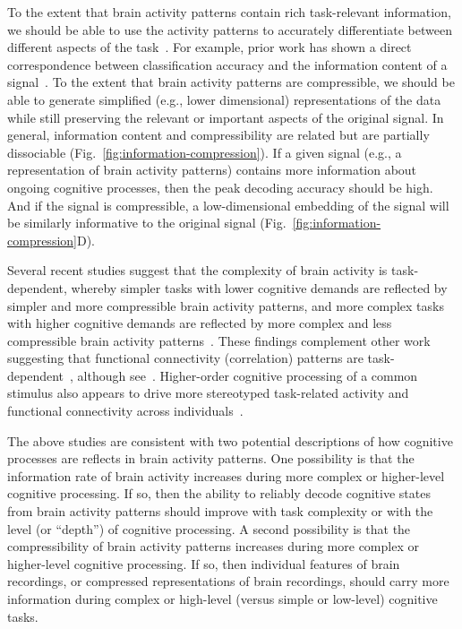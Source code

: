 \documentclass[english, 11pt]{article}
\begin{document}
To the extent that brain activity patterns contain rich task-relevant
information, we should be able to use the activity patterns to accurately
differentiate between different aspects of the task~\citep[e.g., using pattern
classifiers;][]{NormEtal06b}. For example, prior work has shown a direct
correspondence between classification accuracy and the information content of a
signal~\citep{Alva02}. To the extent that brain activity patterns are
compressible, we should be able to generate simplified (e.g., lower
dimensional) representations of the data while still preserving the relevant or
important aspects of the original signal. In general, information content and
compressibility are related but are partially dissociable
(Fig.~\ref{fig:information-compression}). If a given signal (e.g., a
representation of brain activity patterns) contains more information about
ongoing cognitive processes, then the peak decoding accuracy should be high.
And if the signal is compressible, a low-dimensional embedding of the signal
will be similarly informative to the original signal
(Fig.~\ref{fig:information-compression}D).


Several recent studies suggest that the complexity of brain activity is
task-dependent, whereby simpler tasks with lower cognitive demands are
reflected by simpler and more compressible brain activity patterns, and more
complex tasks with higher cognitive demands are reflected by more complex and
less compressible brain activity patterns~\citep{MackEtal20, OwenEtal21}. These
findings complement other work suggesting that functional connectivity
(correlation) patterns are task-dependent~\citep{FinnEtal17, OwenEtal20,
ColeEtal14}, although see~\cite{GratEtal18}. Higher-order cognitive processing
of a common stimulus also appears to drive more stereotyped task-related
activity and functional connectivity across individuals~\citep{HassEtal08,
LernEtal11, SimoChan20, SimoEtal16}.

The above studies are consistent with two potential descriptions of how
cognitive processes are reflects in brain activity patterns. One possibility is
that the information rate of brain activity increases during more complex or
higher-level cognitive processing. If so, then the ability to reliably decode
cognitive states from brain activity patterns should improve with task
complexity or with the level (or ``depth'') of cognitive processing. A second
possibility is that the compressibility of brain activity patterns increases
during more complex or higher-level cognitive processing. If so, then
individual features of brain recordings, or compressed representations of brain
recordings, should carry more information during complex or high-level (versus
simple or low-level) cognitive tasks.
\end{document}
